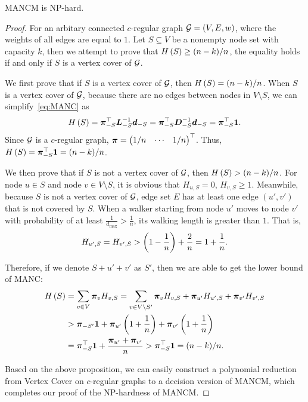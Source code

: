 \documentclass[sigconf]{acmart}
\begin{document}
\begin{theorem}\label{thm:np-hard}
    MANCM is NP-hard.
\end{theorem}
\begin{proof}
    For an arbitary connected \(c\)-regular graph \(\mathcal{G}=(V,E,w)\), where the weights of all edges are equal to \(1\).
    Let \(S\subseteq V\) be a nonempty node set with capacity \(k\), then we attempt to prove that \(H\left(S\right)\ge (n-k)/n\), the equality holds if and only if \(S\) is a vertex cover of \(\mathcal{G}\).

    We first prove that if \(S\) is a vertex cover of \(\mathcal{G}\), then \(H\left(S\right)=(n-k)/n\).
    When \(S\) is a vertex cover of \(\mathcal{G}\), because there are no edges between nodes in \(V\setminus S\), we can simplify~\eqref{eq:MANC} as
    \[H\left(S\right)=\boldsymbol{\pi}_{-S}^\top\boldsymbol{L}_{-S}^{-1}\boldsymbol{d}_{-S}=\boldsymbol{\pi}_{-S}^\top\boldsymbol{D}_{-S}^{-1}\boldsymbol{d}_{-S}=\boldsymbol{\pi}_{-S}^\top\boldsymbol{1}.\]
    Since \(\mathcal{G}\) is a \(c\)-regular graph, \(\boldsymbol{\pi}=\begin{pmatrix}1/n&\cdots&1/n\end{pmatrix}^\top\).
    Thus, \(H\left(S\right)=\boldsymbol{\pi}_{-S}^\top\boldsymbol{1}=(n-k)/n\).

    We then prove that if \(S\) is not a vertex cover of \(\mathcal{G}\), then \(H\left(S\right)>(n-k)/n\).
    For node \(u\in S\) and node \(v\in V\setminus S\), it is obvious that \(H_{u,S}=0\), \(H_{v,S}\ge1\).
    Meanwhile, because \(S\) is not a vertex cover of \(\mathcal{G}\), edge set \(E\) has at least one edge \((u',v')\) that is not covered by \(S\).
    When a walker starting from node \(u'\) moves to node \(v'\) with probability of at least \(\frac{1}{d_{\max}}>\frac{1}{n}\), its walking length is greater than \(1\).
    That is,
    \[H_{u',S}=H_{v',S}>\left( 1-\frac{1}{n} \right)+\frac{2}{n}=1+\frac{1}{n}.\]

    Therefore, if we denote \(S+u'+v'\) as \(S'\), then we are able to get the lower bound of MANC:
    \begin{align*}
        H\left(S\right) & =\sum_{v\in V}\boldsymbol{\pi}_vH_{v,S}=\sum_{v\in V\setminus S'}\boldsymbol{\pi}_vH_{v,S}+\boldsymbol{\pi}_{u'}H_{u',S}+\boldsymbol{\pi}_{v'}H_{v',S} \\
                 & >\boldsymbol{\pi}_{-S'}\boldsymbol{1}+\boldsymbol{\pi}_{u'}\left( 1+\frac{1}{n} \right)+\boldsymbol{\pi}_{v'}\left( 1+\frac{1}{n} \right)                         \\
                 & =\boldsymbol{\pi}_{-S}^\top\boldsymbol{1}+\frac{\boldsymbol{\pi}_{u'}+\boldsymbol{\pi}_{v'}}n
        >\boldsymbol{\pi}_{-S}^\top\boldsymbol{1}=(n-k)/n.
    \end{align*}

    Based on the above proposition, we can easily construct a polynomial reduction from Vertex Cover on \(c\)-regular graphs to a decision version of MANCM, which completes our proof of the NP-hardness of MANCM.

\end{proof}
\end{document}
